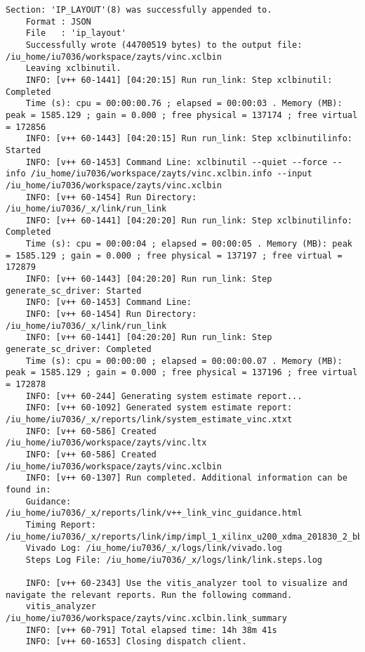 \begin{lstlisting}[caption=Содержимое файла v++\_vinc.log, label={log1}]
	Section: 'IP_LAYOUT'(8) was successfully appended to.
	Format : JSON
	File   : 'ip_layout'
	Successfully wrote (44700519 bytes) to the output file: /iu_home/iu7036/workspace/zayts/vinc.xclbin
	Leaving xclbinutil.
	INFO: [v++ 60-1441] [04:20:15] Run run_link: Step xclbinutil: Completed
	Time (s): cpu = 00:00:00.76 ; elapsed = 00:00:03 . Memory (MB): peak = 1585.129 ; gain = 0.000 ; free physical = 137174 ; free virtual = 172856
	INFO: [v++ 60-1443] [04:20:15] Run run_link: Step xclbinutilinfo: Started
	INFO: [v++ 60-1453] Command Line: xclbinutil --quiet --force --info /iu_home/iu7036/workspace/zayts/vinc.xclbin.info --input /iu_home/iu7036/workspace/zayts/vinc.xclbin
	INFO: [v++ 60-1454] Run Directory: /iu_home/iu7036/_x/link/run_link
	INFO: [v++ 60-1441] [04:20:20] Run run_link: Step xclbinutilinfo: Completed
	Time (s): cpu = 00:00:04 ; elapsed = 00:00:05 . Memory (MB): peak = 1585.129 ; gain = 0.000 ; free physical = 137197 ; free virtual = 172879
	INFO: [v++ 60-1443] [04:20:20] Run run_link: Step generate_sc_driver: Started
	INFO: [v++ 60-1453] Command Line: 
	INFO: [v++ 60-1454] Run Directory: /iu_home/iu7036/_x/link/run_link
	INFO: [v++ 60-1441] [04:20:20] Run run_link: Step generate_sc_driver: Completed
	Time (s): cpu = 00:00:00 ; elapsed = 00:00:00.07 . Memory (MB): peak = 1585.129 ; gain = 0.000 ; free physical = 137196 ; free virtual = 172878
	INFO: [v++ 60-244] Generating system estimate report...
	INFO: [v++ 60-1092] Generated system estimate report: /iu_home/iu7036/_x/reports/link/system_estimate_vinc.xtxt
	INFO: [v++ 60-586] Created /iu_home/iu7036/workspace/zayts/vinc.ltx
	INFO: [v++ 60-586] Created /iu_home/iu7036/workspace/zayts/vinc.xclbin
	INFO: [v++ 60-1307] Run completed. Additional information can be found in:
	Guidance: /iu_home/iu7036/_x/reports/link/v++_link_vinc_guidance.html
	Timing Report: /iu_home/iu7036/_x/reports/link/imp/impl_1_xilinx_u200_xdma_201830_2_bb_locked_timing_summary_routed.rpt
	Vivado Log: /iu_home/iu7036/_x/logs/link/vivado.log
	Steps Log File: /iu_home/iu7036/_x/logs/link/link.steps.log
	
	INFO: [v++ 60-2343] Use the vitis_analyzer tool to visualize and navigate the relevant reports. Run the following command. 
	vitis_analyzer /iu_home/iu7036/workspace/zayts/vinc.xclbin.link_summary 
	INFO: [v++ 60-791] Total elapsed time: 14h 38m 41s
	INFO: [v++ 60-1653] Closing dispatch client.
	
\end{lstlisting} 

